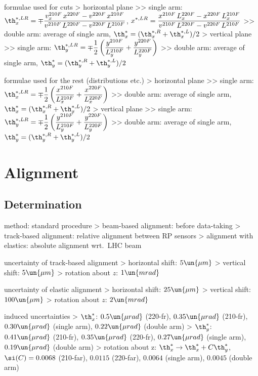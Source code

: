 \> formulae used for cuts
\>> horizontal plane
\>>> single arm: $\displaystyle \th_x^{*,LR} = \mp { v_x^{210F}\,x^{220F} - v^{220F}\,x^{210F} \over v^{210F}\,L^{220F} - v^{220F}\,L^{210F} }$,
$\displaystyle x^{*,LR} = { x^{210F}\,L_x^{220F} - x^{220F}\,L_x^{210F} \over v^{210F}\,L^{220F} - v^{220F}\,L^{210F} }$
\>>> double arm: average of single arm, $\th_x^* = (\th_x^{*,R} + \th_x^{*,L}) / 2$
\>> vertical plane
\>>> single arm: $\displaystyle \th_y^{*,LR} = \mp {1\over 2} \left( {y^{210F}\over L_y^{210F}} + {y^{220F}\over L_y^{220F}} \right)$
\>>> double arm: average of single arm, $\th_y^* = (\th_y^{*,R} + \th_y^{*,L}) / 2$

\> formulae used for the rest (distributions etc.)
\>> horizontal plane
\>>> single arm: $\displaystyle \th_x^{*,LR} = \mp {1\over 2} \left( {x^{210F}\over L_x^{210F}} + {x^{220F}\over L_x^{220F}} \right)$
\>>> double arm: average of single arm, $\th_x^* = (\th_x^{*,R} + \th_x^{*,L}) / 2$
\>> vertical plane
\>>> single arm: $\displaystyle \th_y^{*,LR} = \mp {1\over 2} \left( {y^{210F}\over L_y^{210F}} + {y^{220F}\over L_y^{220F}} \right)$
\>>> double arm: average of single arm, $\th_y^* = (\th_y^{*,R} + \th_y^{*,L}) / 2$

\section{Alignment}

\subsection{Determination}

\> method: standard procedure
\>> beam-based alignment: before data-taking
\>> track-based alignment: relative alignment between RP sensors
\>> alignment with elastics: absolute alignment wrt.~LHC beam

\> uncertainty of track-based alignment
\>> horizontal shift: $5\un{\mu m}$
\>> vertical shift: $5\un{\mu m}$
\>> rotation about $z$: $1\un{mrad}$

\> uncertainty of elastic alignment
\>> horizontal shift: $25\un{\mu m}$
\>> vertical shift: $100\un{\mu m}$
\>> rotation about $z$: $2\un{mrad}$

\> induced uncertainties
\>> $\th_x^*$: $0.5\un{\mu rad}$ (220-fr), $0.35\un{\mu rad}$ (210-fr), $0.30\un{\mu rad}$ (single arm), $0.22\un{\mu rad}$ (double arm)
\>> $\th_y^*$: $0.41\un{\mu rad}$ (210-fr), $0.35\un{\mu rad}$ (220-fr), $0.27\un{\mu rad}$ (single arm), $0.19\un{\mu rad}$ (double arm)
\>> rotation about z: $\th_x^* \rightarrow \th_x^* + C \th_y^*$, $\si(C) = 0.0068$ (210-far), $0.0115$ (220-far), $0.0064$ (single arm), $0.0045$ (double arm)

